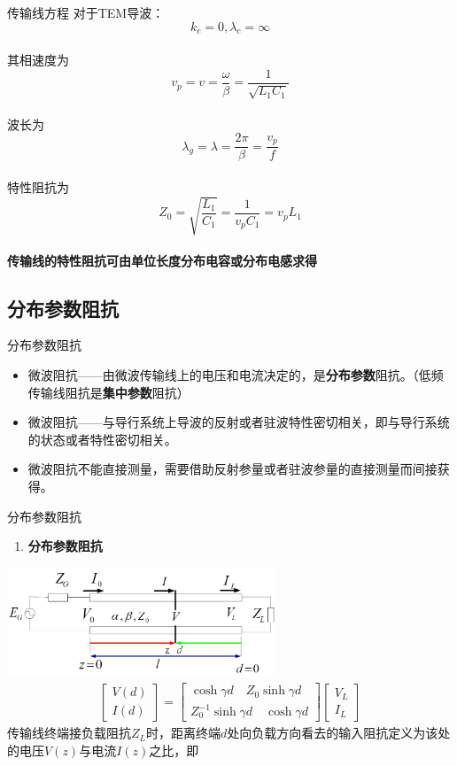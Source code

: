 \begin{frame}{传输线方程}
  对于TEM导波：\\
  $$k_{c}=0,\lambda_{c}=\infty$$\\
  其相速度为\\
  $$v_{p}=v=\frac{\omega}{\beta}=\frac{1}{\sqrt{L_{1}C_{1}}}$$\\
  波长为\\
  $$\lambda_{g}=\lambda=\frac{2\pi}{\beta}=\frac{v_{p}}{f}$$\\
  特性阻抗为\\
  $$Z_{0}=\sqrt{\frac{L_{1}}{C_{1}}}=\frac{1}{v_{p}C_{1}}=v_{p}L_{1}$$\\
  \textbf{传输线的特性阻抗可由单位长度分布电容或分布电感求得}
\end{frame}

\subsection{分布参数阻抗}
\begin{frame}{分布参数阻抗}
  \begin{itemize}
    \item 微波阻抗——由微波传输线上的电压和电流决定的，是\textbf{分布参数}阻抗。（低频传输线阻抗是\textbf{集中参数}阻抗）
    \item 微波阻抗——与导行系统上导波的反射或者驻波特性密切相关，即与导行系统的状态或者特性密切相关。
    \item 微波阻抗不能直接测量，需要借助反射参量或者驻波参量的直接测量而间接获得。
  \end{itemize}
\end{frame}

\begin{frame}{分布参数阻抗}
  \begin{enumerate}
    \item \textbf{分布参数阻抗}
    \saveenum
  \end{enumerate}
  \centering
  \includegraphics[width=8cm]{tmlineboundary.png}
  \begin{align*}
    \begin{bmatrix}
      V(d)\\I(d)
    \end{bmatrix}=
    \begin{bmatrix}
      \cosh\gamma d\quad Z_{0}\sinh\gamma d\\
      Z_{0}^{-1}\sinh\gamma d\quad \cosh\gamma d
    \end{bmatrix}
    \begin{bmatrix}
      V_{L}\\I_{L}
    \end{bmatrix}
  \end{align*}
  \flushleft
  传输线终端接负载阻抗$Z_{L}$时，距离终端$d$处向负载方向看去的输入阻抗定义为该处的电压$V(z)$与电流$I(z)$之比，即
\end{frame}

